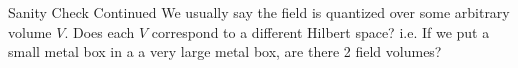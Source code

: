 \begin{frame}{Sanity Check Continued}
    We usually say the field is quantized over some arbitrary volume $V$. Does each $V$ correspond to a different Hilbert space? i.e. If we put a small metal box in a a very large metal box, are there 2 field volumes? 
\end{frame}
